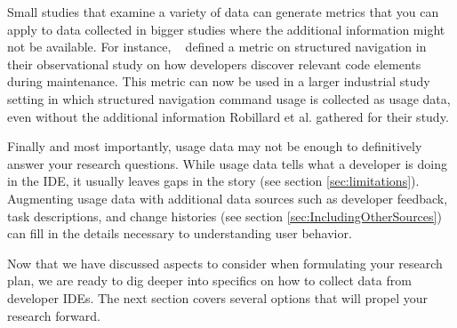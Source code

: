 Small studies that examine a variety of data can generate metrics that you can apply to data collected in bigger studies where the additional information might not be available. 
        For instance, ~ defined a metric on structured navigation in their observational study on how developers discover relevant code elements during maintenance. This metric can now be used in a larger industrial study setting in which structured navigation command usage is collected as usage data, even without the additional information Robillard et al. gathered for their study.

Finally and most importantly, usage data may not be enough to definitively answer your research questions. While usage data tells what a developer is doing in the IDE, it usually leaves gaps in the story (see section \ref{sec:limitations}).  Augmenting usage data with additional data sources such as developer feedback, task descriptions, and change histories (see section \ref{sec:IncludingOtherSources}) can fill in the details necessary to understanding user behavior.

\vspace{0.1in}

Now that we have discussed aspects to consider when formulating your research plan, we are ready to dig deeper into specifics on how to collect data from developer IDEs.  The next section covers several options that will propel your research forward.


